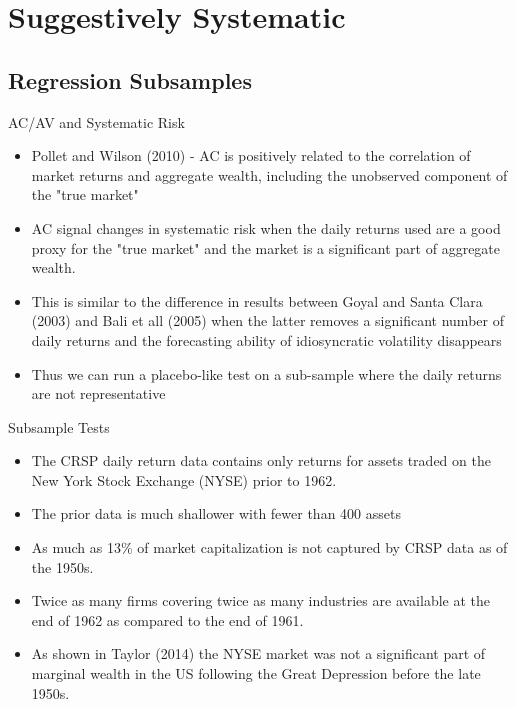 \documentclass[handout]{beamer}
\begin{document}
%			



\section{Suggestively Systematic}

\subsection{Regression Subsamples}

\begin{frame}{AC/AV and Systematic Risk}
	\begin{itemize}[<+->]
		\item Pollet and Wilson (2010) - AC is positively related to the correlation of market returns and aggregate wealth, including the unobserved component of the "true market"
		\item AC signal changes in systematic risk when the daily returns used are a good proxy for the "true market" and the market is a significant part of aggregate wealth.
		\item This is similar to the difference in results between Goyal and Santa Clara (2003) and Bali et all (2005) when the latter removes a significant number of daily returns and the forecasting ability of idiosyncratic volatility disappears
		\item Thus we can run a placebo-like test on a sub-sample where the daily returns are not representative
	\end{itemize}
\end{frame}

\begin{frame}{Subsample Tests}
	\begin{itemize}[<+->]
		\item The CRSP daily return data contains only returns for assets traded on the New York Stock Exchange (NYSE) prior to 1962. 
		\item The prior data is much shallower with fewer than 400 assets 
		\item As much as 13\% of market capitalization is not captured by CRSP data as of the 1950s. 
		\item Twice as many firms covering twice as many industries are available at the end of 1962 as compared to the end of 1961. 
		\item As shown in Taylor (2014) the NYSE market was not a significant part of marginal wealth in the US following the Great Depression before the late 1950s. 
	\end{itemize}
\end{frame}
\end{document}
